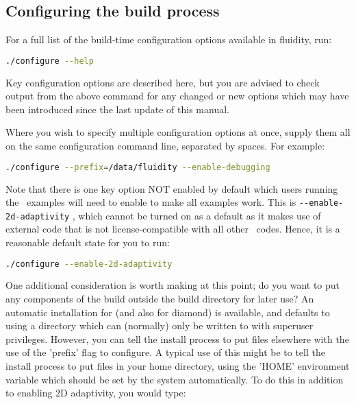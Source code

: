 \subsection{Configuring the build process}
\label{sec:configuring_the_build_process}

For a full list of the build-time configuration options available in fluidity,
run:

\begin{lstlisting}[language=Bash]
./configure --help
\end{lstlisting}

Key configuration options are described here, but you are advised to check
output from the above command for any changed or new options which may have
been introduced since the last update of this manual.

Where you wish to specify multiple configuration options at once, supply them
all on the same configuration command line, separated by spaces. For example:

\begin{lstlisting}[language=Bash]
./configure --prefix=/data/fluidity --enable-debugging
\end{lstlisting}

Note that there is one key option NOT enabled by default which users running
the \fluidity\ examples will need to enable to make all examples work. This is 
\lstinline[language=Bash]+--enable-2d-adaptivity+ , which cannot be turned on
as a default as it makes use of external code that is not license-compatible
with all other \fluidity\ codes. Hence, it is a reasonable default state for
you to run:

\begin{lstlisting}[language=Bash]
./configure --enable-2d-adaptivity
\end{lstlisting}

One additional consideration is worth making at this point; do you want to put
any components of the \fluidity build outside the build directory for later
use?  An automatic installation for \fluidity (and also for diamond) is
available, and defaults to using a directory which can (normally) only be
written to with superuser privileges. However, you can tell the install process
to put files elsewhere with the use of the 'prefix' flag to configure. A
typical use of this might be to tell the install process to put files in your
home directory, using the 'HOME' environment variable which should be set by
the system automatically. To do this in addition to enabling 2D adaptivity, you
would type:

